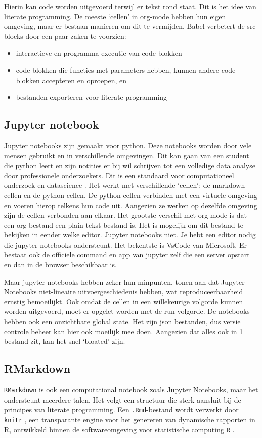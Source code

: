 Hierin kan code worden uitgevoerd terwijl er tekst rond staat.
Dit is het idee van literate programming.
De meeste `cellen' in org-mode hebben hun eigen omgeving, maar er bestaan manieren om dit te vermijden.
Babel verbetert de src-blocks door een paar zaken te voorzien:
\begin{itemize}
	\item interactieve en programma executie van code blokken
	\item code blokken die functies met parameters hebben, kunnen andere code blokken accepteren en oproepen, en
	\item bestanden exporteren voor literate programming
\end{itemize}

\subsection{Jupyter notebook}
Jupyter notebooks zijn gemaakt voor python. Deze notebooks worden door vele mensen gebruikt en in verschillende omgevingen.
Dit kan gaan van een student die python leert en zijn notities er bij wil schrijven tot een volledige data analyse door professionele onderzoekers.
Dit is een standaard voor computationeel onderzoek en datascience \autocite{jupyternotebook}.
Het werkt met verschillende `cellen`: de markdown cellen en de python cellen.
De python cellen verbinden met een virtuele omgeving en voeren hierop telkens hun code uit.
Aangezien ze werken op dezelfde omgeving zijn de cellen verbonden aan elkaar.
Het grootste verschil met org-mode is dat een org bestand een plain tekst bestand is. Het is mogelijk om dit bestand te bekijken in eender welke editor.
Jupyter notebooks niet. Je hebt een editor nodig die jupyter notebooks ondersteunt. Het bekentste is VsCode van Microsoft.
Er bestaat ook de officiele command en app van jupyter zelf die een server opstart en dan in de browser beschikbaar is.

Maar jupyter notebooks hebben zeker hun minpunten.
\textcite{Rule2018} tonen aan dat Jupyter Notebooks niet-lineaire uitvoergeschiedenis hebben, wat reproduceerbaarheid ernstig bemoeilijkt.
Ook omdat de cellen in een willekeurige volgorde kunnen worden uitgevoerd, moet er opgelet worden met de run volgorde.
De notebooks hebben ook een onzichtbare global state.
Het zijn json bestanden, dus versie controle beheer kan hier ook moeilijk mee doen.
Aangezien dat alles ook in 1 bestand zit, kan het snel `bloated' zijn.

\subsection{RMarkdown}
\texttt{RMarkdown} \autocite{RStudio2020} is ook een computational notebook zoals Jupyter Notebooks,
maar het ondersteunt meerdere talen. Het volgt een structuur die sterk aansluit bij de principes van
literate programming. Een \texttt{.Rmd}-bestand wordt verwerkt door \texttt{knitr} \autocite{Xie2025},
een transparante engine voor het genereren van dynamische rapporten in R, ontwikkeld binnen de
softwareomgeving voor statistische computing \texttt{R} \autocite{RFoundation}.

